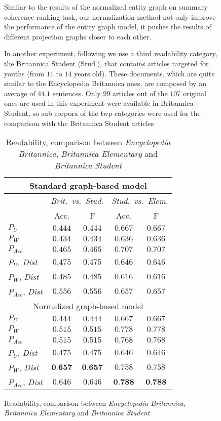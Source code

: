 \begin{figure}[!t]
Similar to the results of the normalized entity graph on summary coherence ranking task, our normalization method not only improve the performance of the entity graph model, it pushes the results of different projection graphs closer to each other. 

 
In another experiment, following \cite{guinaudeau13} we use a third readability category, the Britannica Student (Stud.), that contains articles targeted for youths (from $11$ to $14$ years old). 
These documents, which are quite similar to the Encyclopedia Britannica ones, are composed by an average of $44.1$ sentences. 
Only $99$ articles out of the $107$ original ones are used in this experiment were available in Britannica Student, so sub corpora of the twp categories were used for the comparison with the Britannica Student articles

\begin{table}[!t] 
 \centering
 \begin{tabular}{l|cc|cc} 
  \multicolumn{5}{c}{Standard graph-based model}\\\hline
  & \multicolumn{2}{|c}{\textit{Brit.\ vs.\ Stud.}} &
	\multicolumn{2}{|c}{\textit{Stud.\ vs.\ Elem.}}\\\hline 
  & Acc. & F & Acc. & F\\\hline
   $P_U$ & $0.444$ & $0.444$ & $0.667$ & $0.667$\\
   $P_W$ & $0.434$ & $0.434$ & $0.636$ & $0.636$\\ 
   $P_{Acc}$ & $0.465$ & $0.465$ & $0.707$ & $0.707$\\
   $P_U$, \textit{Dist} & $0.475$ & $0.475$ & $0.646$ & $0.646$\\
   $P_W$, \textit{Dist} & $0.485$ & $0.485$ & $0.616$ & $0.616$\\
   $P_{Acc}$, \textit{Dist} & $0.556$ & $0.556$ & $0.657$ & $0.657$\\\hline 
  
    \multicolumn{5}{c}{Normalized graph-based model}\\\hline
   $P_U$ & $0.444$ & $0.444$ & $0.667$ & $0.667$\\
   $P_W$ & $0.515$ & $0.515$ & $0.778$ & $0.778$\\ 
   $P_{Acc}$ & $0.515$ & $0.515$ & $0.768$ & $0.768$\\
   $P_U$, \textit{Dist} & $0.475$ & $0.475$ & $0.646$ & $0.646$\\
   $P_W$, \textit{Dist} & $\textbf{0.657}$ & $\textbf{0.657}$ & $0.758$ & $0.758$\\
   $P_{Acc}$, \textit{Dist} & $0.646$ & $0.646$ & $\textbf{0.788}$ & $\textbf{0.788}$\\
 \end{tabular}
 \caption{Readability, comparison between \emph{Encyclopedia Britannica}, \emph{Britannica Elementary} and \emph{Britannica Student}}
 \label{t:exp3:stu}
 \end{table}


\end{figure}
